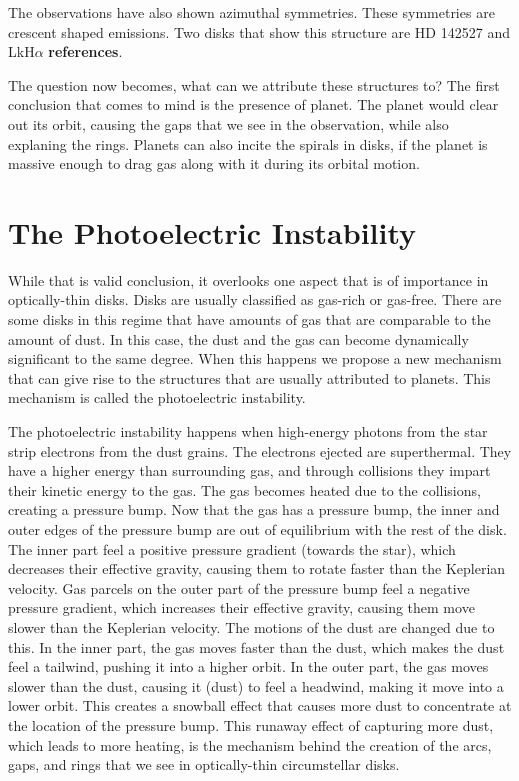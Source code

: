\documentclass[onecolumn]{report}
\begin{document}
The observations have also shown azimuthal symmetries. These symmetries are crescent shaped emissions. Two disks that show this structure are HD 142527 and LkH$\alpha$ \textbf{references}. 

The question now becomes, what can we attribute these structures to? The first conclusion that comes to mind is the presence of planet. The planet would clear out its orbit, causing the gaps that we see in the observation, while also explaning the rings. Planets can also incite the spirals in disks, if the planet is massive enough to drag gas along with it during its orbital motion.

\section{The Photoelectric Instability}

While that is valid conclusion, it overlooks one aspect that is of importance in optically-thin disks. Disks are usually classified as gas-rich or gas-free. There are some disks in this regime that have amounts of gas that are comparable to the amount of dust. In this case, the dust and the gas can become dynamically significant to the same degree. When this happens we propose a new mechanism that can give rise to the structures that are usually attributed to planets. This mechanism is called the photoelectric instability.

The photoelectric instability happens when high-energy photons from the star strip electrons from the dust grains. The electrons ejected are superthermal. They have a higher energy than surrounding gas, and through collisions they impart their kinetic energy to the gas. The gas becomes heated due to the collisions, creating a pressure bump. Now that the gas has a pressure bump, the inner and outer edges of the pressure bump are out of equilibrium with the rest of the disk. The inner part feel a positive pressure gradient (towards the star), which decreases their effective gravity, causing them to rotate faster than the Keplerian velocity. Gas parcels on the outer part of the pressure bump feel a negative pressure gradient, which increases their effective gravity, causing them move slower than the Keplerian velocity. The motions of the dust are changed due to this. In the inner part, the gas moves faster than the dust, which makes the dust feel a tailwind, pushing it into a higher orbit. In the outer part, the gas moves slower than the dust, causing it (dust) to feel a headwind, making it move into a lower orbit. This creates a snowball effect that causes more dust to concentrate at the location of the pressure bump. This runaway effect of capturing more dust, which leads to more heating, is the mechanism behind the creation of the arcs, gaps, and rings that we see in optically-thin circumstellar disks.
\end{document}
